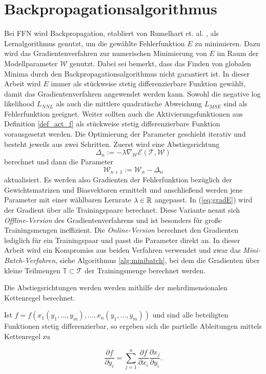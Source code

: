  \section*{Backpropagationsalgorithmus}
Bei FFN wird Backpropagation, etabliert von Rumelhart et. al. \cite{MLPbook}, als Lernalgorithmus genutzt, um die gewählte Fehlerfunktion $E$ zu minimieren. Dazu wird das Gradientenverfahren zur numerischen Minimierung von $E$ im Raum der Modellparameter $\mathcal{W}$ genutzt. Dabei sei bemerkt, dass das Finden von globalen Minima durch den Backpropagationsalgorithmus nicht garantiert ist.
In dieser Arbeit wird $E$ immer als stückweise stetig differenzierbare Funktion gewählt, damit das Gradientenverfahren angewendet werden kann. Sowohl die negative log likelihood $L_{NNL}$ als auch die mittlere quadratische Abweichung $L_{MSE}$ sind als Fehlerfunktion geeignet. Weiter sollten auch die Aktivierungsfunktionen aus Definition \ref{def_act_f} als stückweise stetig differenzierbare Funktion vorausgesetzt werden. 
Die Optimierung der Parameter geschieht iterativ und besteht jeweils aus zwei Schritten. Zuerst wird eine Abstiegsrichtung 
\begin{equation}
    \label{eq:gradE}
    \Delta_n :=- \lambda \nabla_{\mathcal{W}} \mathcal{E}(\mathcal{T},\mathcal{W})
\end{equation} 
berechnet und dann die Parameter 
\begin{equation}
    \label{eq:step}
    \mathcal{W}_{n+1}:=\mathcal{W}_n- \Delta_n
\end{equation}
aktualisiert. Es werden also Gradienten der Fehlerfunktion bezüglich der Gewichtsmatrizen und Biasvektoren ermittelt und anschließend werden jene Parameter mit einer wählbaren Lernrate $\lambda \in \mathbb{R}$ angepasst. In (\ref{eq:gradE}) wird der Gradient über alle Trainingspaare berechnet. Diese Variante nennt sich \textit{Offline-Version} des Gradientenverfahrens und ist besonders für große Trainingsmengen ineffizient. Die \textit{Online-Version} berechnet den Gradienten lediglich für ein Trainingspaar und passt die Parameter direkt an. In dieser Arbeit wird ein Kompromiss aus beiden Verfahren verwendet und zwar das \textit{Mini-Batch-Verfahren}, siehe Algorithmus \ref{alg:minibatch}, bei dem die Gradienten über kleine Teilmengen $\mathbb{T} \subset \mathcal{T}$ der Trainingsmenge berechnet werden.

Die Abstiegsrichtungen werden werden mithilfe der mehrdimensionalen Kettenregel  berechnet.
\begin{satz}
    \label{chainrule}
    Ist $f=f(x_1(y_1, \ldots, y_m), \ldots, x_n(y_1, \ldots, y_m))$ und sind alle beteiligten Funktionen stetig differenzierbar, so ergeben sich die partielle Ableitungen mittels Kettenregel zu

    \begin{equation*}
        \frac{\partial f}{\partial y_i}=\sum_{j=1}^n \frac{\partial f}{\partial x_i} \frac{\partial x_j}{\partial y_i} .
    \end{equation*}
\end{satz}

